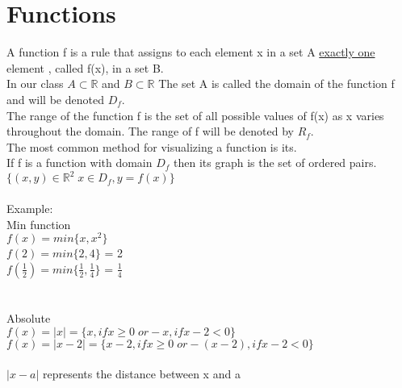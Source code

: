 \documentclass{article}
\begin{document}
\section{Functions}
A function f is a rule that assigns to each element x in a set A \underline{exactly one} element , called f(x), in a set B. \\
In our class $ A \subset \mathbb{R} $ and $ B \subset \mathbb{R}$
The set A is called the domain of the function f and will be denoted $D_f$.\\
The range of the function f is the set of all possible values of f(x) as x varies throughout the domain. The range of f will be denoted by $R_f$.\\
The most common method for visualizing a function is its.\\ 
If f is a function with domain $D_f$ then its graph is the set of ordered pairs. \\
$ \{(x, y) \in \mathbb{R}^2 \; x\in D_f, y=f(x) \}$ \\ \\
Example: \\ 
Min function  \\
$f(x) = min\{x, x^2\}$ \\
$f(2) = min\{2, 4\}$ = 2 \\
$f(\frac{1}{2}) = min\{\frac{1}{2}, \frac{1}{4}\}$ = $\frac{1}{4}$ \\ \\ \\
Absolute \\
$f(x) = |x| = \{x, if x \geq 0 \; or -x, if x-2 < 0\}$\\
$f(x) = |x -2| = \{x-2, if x \geq 0 \; or -(x-2), if x-2 < 0\}$ \\ \\
$|x-a|$ represents the distance between x and a
\end{document}
